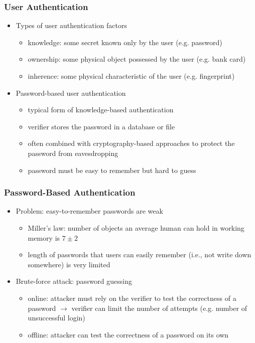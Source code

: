 \documentclass[final]{article}
\begin{document}
\subsubsection*{User Authentication}
\begin{itemize}[nosep]
    \item Types of user authentication factors
          \begin{itemize}[nosep]
              \item knowledge: some secret known only by the user (e.g. password)
              \item ownership: some physical object possessed by the user (e.g. bank card)
              \item inherence: some physical characteristic of the user (e.g. fingerprint)
          \end{itemize}
    \item Password-based user authentication
          \begin{itemize}[nosep]
              \item typical form of knowledge-based authentication
              \item verifier stores the password in a database or file
              \item often combined with cryptography-based approaches to protect the password from eavesdropping
              \item password must be easy to remember but hard to guess
          \end{itemize}
\end{itemize}
\subsubsection*{Password-Based Authentication}
\begin{itemize}
    \item Problem: easy-to-remember passwords are weak
          \begin{itemize}[nosep]
              \item Miller's law: number of objects an average human can hold in working memory is $7 \pm 2$
              \item length of passwords that users can easily remember (i.e., not write down somewhere) is very limited
          \end{itemize}
    \item Brute-force attack: password guessing
          \begin{itemize}
              \item online: attacker must rely on the verifier to test the correctness of a password $\rightarrow$ verifier can limit the number of attempts (e.g. number of unsuccessful login)
              \item offline: attacker can test the correctness of a password on its own
          \end{itemize}
\end{itemize}
\end{document}

